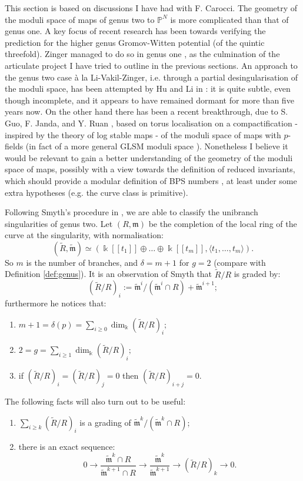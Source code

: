 \documentclass[11pt]{amsart}
\newcommand{\PP}{\mathbb P}
\renewcommand{\to}{\rightarrow}
\newcommand{\kk}{\Bbbk}
\newcommand{\m}{\mathfrak m}
\newcommand{\tR}{\widetilde{R}}
\newcommand{\tm}{\widetilde{\mathfrak m}}
\theoremstyle{definition}
\theoremstyle{definition}
\begin{document}
This section is based on discussions I have had with F. Carocci. The geometry of the moduli space of maps of genus two to $\PP^N$ is more complicated than that of genus one. A key focus of recent research has been towards verifying the \cite{BCOV} prediction for the higher genus Gromov-Witten potential (of the quintic threefold). Zinger managed to do so in genus one \cite{Zinger-CYhyp}, as the culmination of the articulate project I have tried to outline in the previous sections. An approach to the genus two case \`a la Li-Vakil-Zinger, i.e. through a partial desingularisation of the moduli space, has been attempted by Hu and Li in \cite{HL2}: it is quite subtle, even though incomplete, and it appears to have remained dormant for more than five years now. On the other hand there has been a recent breakthrough, due to S. Guo, F. Janda, and Y. Ruan \cite{GJR}, based on torus localisation on a compactification - inspired by the theory of log stable maps - of the moduli space of maps with $p$-fields (in fact of a more general GLSM moduli space \cite{CJRS}). Nonetheless I believe it would be relevant to gain a better understanding of the geometry of the moduli space of maps, possibly with a view towards the definition of reduced invariants, which should provide a modular definition of BPS numbers \cite{PandhaHodge}, at least under some extra hypotheses (e.g. the curve class is primitive).

Following Smyth's procedure in \cite[Appendix A]{SMY1}, we are able to classify the unibranch singularities of genus two. Let $(R,\m)$ be the completion of the local ring of the curve at the singularity, with normalisation:
\[(\tR,\tm)\simeq\left(\kk[\![t_1]\!]\oplus\ldots\oplus\kk[\![t_m]\!],\langle t_1,\ldots,t_m\rangle\right).\]
So $m$ is the number of branches, and $\delta=m+1$ for $g=2$ (compare with Definition \ref{def:genus}). It is an observation of Smyth that $\tR/R$ is graded by:
\[ (\tR/R)_i:=\tm^i/(\tm^i\cap R)+\tm^{i+1};\]
furthermore he notices that:
\begin{enumerate}
\item $m+1=\delta(p)=\sum_{i\geq 0}\dim_\kk(\tR/R)_i;$
\item $2=g=\sum_{i\geq 1}\dim_\kk(\tR/R)_i;$
\item if $(\tR/R)_i=(\tR/R)_j=0$ then $(\tR/R)_{i+j}=0$.
\end{enumerate}
The following facts will also turn out to be useful:
\begin{enumerate}[resume]
 \item $\sum_{i\geq k}(\tR/R)_i$ is a grading of $\tm^k/(\tm^k\cap R)$;
 \item there is an exact sequence:
 \[ 0\to \frac{\tm^k\cap R}{\tm^{k+1}\cap R}\to \frac{\tm^k}{\tm^{k+1}}\to \left(\tR/R\right)_k\to 0.\]
\end{enumerate}
\end{document}
